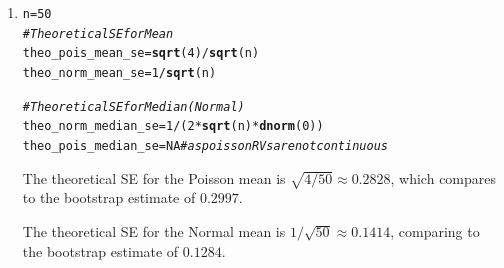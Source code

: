 \documentclass[12pt,english]{article}\usepackage[]{graphicx}\usepackage[]{xcolor}
\makeatletter
\newcommand{\hlnum}[1]{\textcolor[rgb]{0.686,0.059,0.569}{#1}}%
\newcommand{\hlcom}[1]{\textcolor[rgb]{0.678,0.584,0.686}{\textit{#1}}}%
\newcommand{\hlopt}[1]{\textcolor[rgb]{0,0,0}{#1}}%
\newcommand{\hldef}[1]{\textcolor[rgb]{0.345,0.345,0.345}{#1}}%
\newcommand{\hlkwb}[1]{\textcolor[rgb]{0.69,0.353,0.396}{#1}}%
\newcommand{\hlkwd}[1]{\textcolor[rgb]{0.737,0.353,0.396}{\textbf{#1}}}%
\newenvironment{kframe}{%
 \def\at@end@of@kframe{}%
 \ifinner\ifhmode%
  \def\at@end@of@kframe{\end{minipage}}%
  \begin{minipage}{\columnwidth}%
 \fi\fi%
 \def\FrameCommand##1{\hskip\@totalleftmargin \hskip-\fboxsep
 \colorbox{shadecolor}{##1}\hskip-\fboxsep
     \hskip-\linewidth \hskip-\@totalleftmargin \hskip\columnwidth}%
 \MakeFramed {\advance\hsize-\width
   \@totalleftmargin\z@ \linewidth\hsize
   \@setminipage}}%
 {\par\unskip\endMakeFramed%
 \at@end@of@kframe}
\newenvironment{knitrout}{}{} %
\makeatother
\begin{document}
\begin{enumerate}[label=\arabic*.]
\begin{enumerate}[label=(\alph*)]
\begin{enumerate}[label=(\alph*)]
\begin{knitrout}
\begin{kframe}
\begin{verbatim}
## [1] 0.165529
\end{verbatim}
\end{kframe}
\end{knitrout}
					\item
\begin{knitrout}
\color{fgcolor}\begin{kframe}
\begin{alltt}
\hldef{n} \hlkwb{=} \hlnum{50}
\hlcom{# Theoretical SE for Mean}
\hldef{theo_pois_mean_se} \hlkwb{=} \hlkwd{sqrt}\hldef{(}\hlnum{4}\hldef{)}\hlopt{/}\hlkwd{sqrt}\hldef{(n)}
\hldef{theo_norm_mean_se} \hlkwb{=} \hlnum{1}\hlopt{/}\hlkwd{sqrt}\hldef{(n)}

\hlcom{# Theoretical SE for Median (Normal)}
\hldef{theo_norm_median_se} \hlkwb{=} \hlnum{1} \hlopt{/} \hldef{(}\hlnum{2} \hlopt{*} \hlkwd{sqrt}\hldef{(n)} \hlopt{*} \hlkwd{dnorm}\hldef{(}\hlnum{0}\hldef{))}
\hldef{theo_pois_median_se} \hlkwb{=} \hlnum{NA} \hlcom{#as poisson RVs are not continuous}
\end{alltt}
\end{kframe}
\end{knitrout}
                
                		The theoretical SE for the Poisson mean is $\sqrt{4/50} \approx 0.2828$, which compares to the bootstrap estimate of $0.2997$. 
                
                		The theoretical SE for the Normal mean is $1/\sqrt{50} \approx 0.1414$, comparing to the bootstrap estimate of $0.1284$.
                

\end{enumerate}
\end{enumerate}
\end{enumerate}
\end{document}
